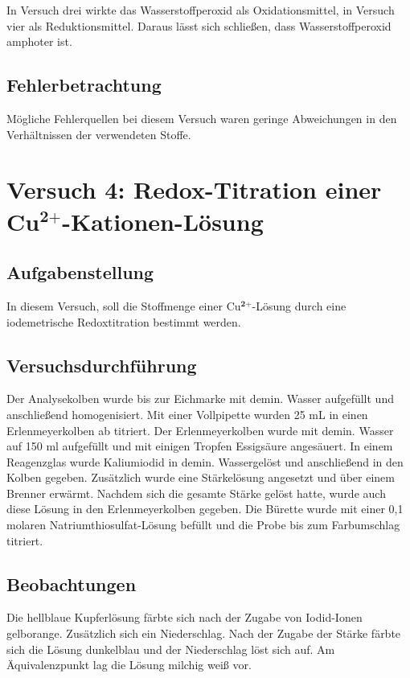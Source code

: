 \documentclass[12pt]{scrartcl} %
\begin{document}
\newpage


In Versuch drei wirkte das Wasserstoffperoxid als Oxidationsmittel, in Versuch vier als Reduktionsmittel. Daraus lässt sich schließen, dass Wasserstoffperoxid amphoter ist.



\subsection{Fehlerbetrachtung}
Mögliche Fehlerquellen bei diesem Versuch waren geringe Abweichungen in den Verhältnissen der verwendeten Stoffe.



\section{Versuch 4: Redox-Titration einer Cu$^{\textbf{2+}}$-Kationen-Lösung}

\subsection{Aufgabenstellung}
In diesem Versuch, soll die Stoffmenge einer Cu$^{\textbf{2+}}$-Lösung durch eine iodemetrische Redoxtitration bestimmt werden.


\subsection{Versuchsdurchführung}
Der Analysekolben wurde bis zur Eichmarke mit demin. Wasser aufgefüllt und anschließend homogenisiert. Mit einer Vollpipette wurden 25 mL in einen Erlenmeyerkolben ab titriert. Der Erlenmeyerkolben wurde mit demin. Wasser auf 150 ml aufgefüllt und mit einigen Tropfen Essigsäure angesäuert. In einem Reagenzglas wurde Kaliumiodid in demin. Wassergelöst und anschließend in den Kolben gegeben. Zusätzlich wurde eine Stärkelösung angesetzt und über einem Brenner erwärmt. Nachdem sich die gesamte Stärke gelöst hatte, wurde auch diese Lösung in den Erlenmeyerkolben gegeben. Die Bürette wurde mit einer 0,1 molaren  Natriumthiosulfat-Lösung befüllt und die Probe bis zum Farbumschlag titriert.   


\subsection{Beobachtungen}
Die hellblaue Kupferlösung färbte sich nach der Zugabe von Iodid-Ionen gelborange. Zusätzlich  sich ein Niederschlag. Nach der Zugabe der Stärke färbte sich die Lösung dunkelblau und der Niederschlag löst sich auf. Am Äquivalenzpunkt lag die Lösung milchig weiß vor.
\end{document}
